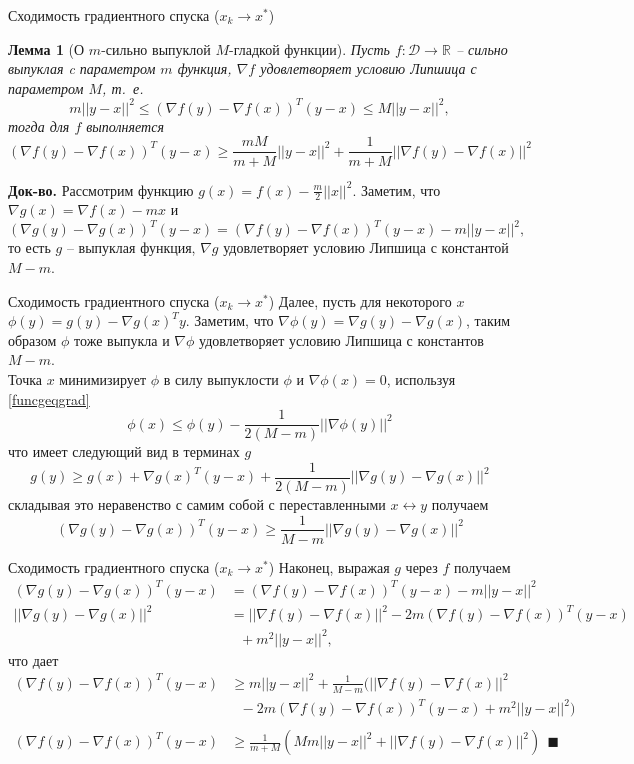 \documentclass[10pt]{beamer}
\newtheorem{lemma_ru}{Лемма}[]
\begin{document}
\begin{frame}{Сходимость градиентного спуска ($x_k\rightarrow x^*$)}
\begin{lemma_ru}[О $m$-сильно выпуклой $M$-гладкой функции]
Пусть $f:\mathcal{D}\rightarrow \mathbb{R}$ -- сильно выпуклая c параметром $m$ функция, $\nabla f$ удовлетворяет условию
Липшица с параметром $M$, т.~е.
$$
m||y-x||^2\leq (\nabla f(y)-\nabla f(x))^T(y-x)\leq M||y-x||^2,
$$
тогда для $f$ выполняется
$$
(\nabla f(y)-\nabla f(x))^T(y-x)\geq \frac{mM}{m+M}||y-x||^2+\frac{1}{m+M}||\nabla f(y)-\nabla f(x)||^2
$$
\end{lemma_ru}
\pause
\textbf{Док-во.} Рассмотрим функцию $g(x)=f(x)-\frac{m}{2}||x||^2$. Заметим, что $\nabla g(x)=\nabla f(x)-mx$ и
$$
(\nabla g(y)-\nabla g(x))^T(y-x)=(\nabla f(y)-\nabla f(x))^T(y-x)-m||y-x||^2,
$$
то есть $g$ -- выпуклая функция, $\nabla g$ удовлетворяет условию Липшица с константой $M-m$.
\end{frame}

\begin{frame}{Сходимость градиентного спуска ($x_k\rightarrow x^*$)}
Далее, пусть для некоторого $x$ $\phi(y)=g(y)-\nabla g(x)^Ty$. Заметим, что $\nabla \phi(y)=\nabla g(y)-\nabla g(x)$, таким
образом $\phi$ тоже выпукла и $\nabla \phi$ удовлетворяет условию Липшица с константов $M-m$.\\
\pause
\vspace{1em}
Точка $x$ минимизирует $\phi$ в силу выпуклости $\phi$ и $\nabla \phi(x)=0$, используя \eqref{funcgeqgrad}
$$
\phi(x)\leq \phi(y)-\frac{1}{2(M-m)}||\nabla \phi(y)||^2
$$
что имеет следующий вид в терминах $g$
$$
g(y)\geq g(x)+\nabla g(x)^T(y-x)+\frac{1}{2(M-m)}||\nabla g(y)-\nabla g(x)||^2
$$
\pause
складывая это неравенство с самим собой с переставленными $x\leftrightarrow y$ получаем
$$
(\nabla g(y)-\nabla g(x))^T(y-x)\geq \frac{1}{M-m}||\nabla g(y)-\nabla g(x)||^2
$$
\end{frame}

\begin{frame}{Сходимость градиентного спуска ($x_k\rightarrow x^*$)}
Наконец, выражая $g$ через $f$ получаем
\begin{align*}
(\nabla g(y)-\nabla g(x))^T(y-x)&=(\nabla f(y)-\nabla f(x))^T(y-x)-m||y-x||^2\\
||\nabla g(y)-\nabla g(x)||^2&=||\nabla f(y)-\nabla f(x)||^2-2m(\nabla f(y)-\nabla f(x))^T(y-x)\\
&~~~+m^2||y-x||^2,
\end{align*}
\pause
что дает
\begin{align*}
(\nabla f(y)-\nabla f(x))^T(y-x)&\geq m||y-x||^2+\frac{1}{M-m}(||\nabla f(y)-\nabla f(x)||^2\\
&~~~-2m(\nabla f(y)-\nabla f(x))^T(y-x)+m^2||y-x||^2)\\
\end{align*}
\pause
\begin{align*}
(\nabla f(y)-\nabla f(x))^T(y-x)&\geq \frac{1}{m+M}(Mm||y-x||^2+||\nabla f(y)-\nabla f(x)||^2)~~\blacksquare
\end{align*}
\end{frame}
\end{document}
